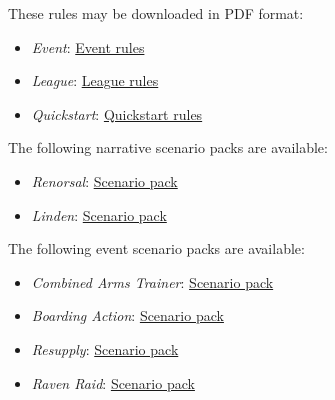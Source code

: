 These rules may be downloaded in PDF format:

\begin{itemize}

\item \emph{Event}: \href{https://raw.githubusercontent.com/Eudicods/outworlds-wastes/rules-pdf/battletech-outworlds-wastes-event.pdf}{Event rules}

\item \emph{League}: \href{https://raw.githubusercontent.com/Eudicods/outworlds-wastes/rules-pdf/battletech-outworlds-wastes.pdf}{League rules}

\item \emph{Quickstart}: \href{https://raw.githubusercontent.com/Eudicods/outworlds-wastes/rules-pdf/battletech-outworlds-wastes-quickstart.pdf}{Quickstart rules}

\end{itemize}

The following narrative scenario packs are available:

\begin{itemize}

\item \emph{Renorsal}: \href{https://raw.githubusercontent.com/Eudicods/outworlds-wastes/rules-pdf/renorsal.pdf}{Scenario pack}

\item \emph{Linden}: \href{https://raw.githubusercontent.com/Eudicods/outworlds-wastes/rules-pdf/linden.pdf}{Scenario pack}

\end{itemize}

The following event scenario packs are available:

\begin{itemize}

\item \emph{Combined Arms Trainer}: \href{https://raw.githubusercontent.com/Eudicods/outworlds-wastes/rules-pdf/combined-arms-trainer.pdf}{Scenario pack}

\item \emph{Boarding Action}: \href{https://raw.githubusercontent.com/Eudicods/outworlds-wastes/rules-pdf/boarding-action.pdf}{Scenario pack}

\item \emph{Resupply}: \href{https://raw.githubusercontent.com/Eudicods/outworlds-wastes/rules-pdf/resupply.pdf}{Scenario pack}

\item \emph{Raven Raid}: \href{https://raw.githubusercontent.com/Eudicods/outworlds-wastes/rules-pdf/raven-raid.pdf}{Scenario pack}

\end{itemize}

